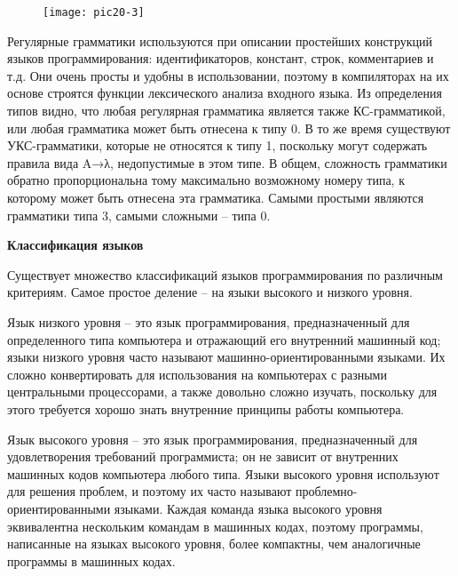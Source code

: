 \begin{figure}[h]
    \begin{center}
    \texttt{[image: pic20-3]}
    \end{center}
\end{figure}

    Регулярные грамматики используются при описании простейших конструкций языков программирования: идентификаторов, констант, строк, комментариев и т.д. Они очень просты и удобны в использовании, поэтому в компиляторах на их основе строятся функции лексического анализа входного языка. Из определения типов видно, что любая регулярная грамматика является также КС-грамматикой, или любая грамматика может быть отнесена к типу 0. В то же время существуют УКС-грамматики, которые не относятся к типу 1, поскольку могут содержать правила вида A→λ, недопустимые в этом типе. В общем, сложность грамматики обратно пропорциональна тому максимально возможному номеру типа, к которому может быть отнесена эта грамматика. Самыми простыми являются грамматики типа 3, самыми сложными – типа 0.


    \begin{center}{\bfseries Классификация языков}
\end{center}

Существует множество классификаций языков программирования по различным критериям. Самое простое деление – на языки высокого и низкого уровня.

\begin{opr}
  Язык низкого уровня – это язык программирования, предназначенный для определенного типа компьютера и отражающий его внутренний машинный код; языки низкого уровня часто называют машинно-ориентированными языками. Их сложно конвертировать для использования на компьютерах с разными центральными процессорами, а также довольно сложно изучать, поскольку для этого требуется хорошо знать внутренние принципы работы компьютера.
\end{opr}

\begin{opr}
  Язык высокого уровня – это язык программирования, предназначенный для удовлетворения требований программиста; он не зависит от внутренних машинных кодов компьютера любого типа. Языки высокого уровня используют для решения проблем, и поэтому их часто называют проблемно-ориентированными языками. Каждая команда языка высокого уровня эквивалентна нескольким командам в машинных кодах, поэтому программы, написанные на языках высокого уровня, более компактны, чем аналогичные программы в машинных кодах.
\end{opr}

